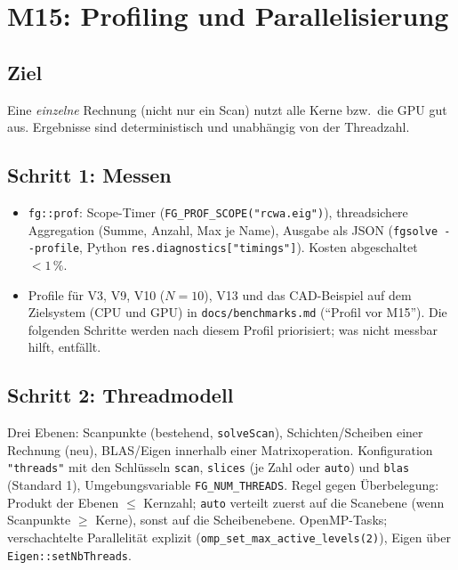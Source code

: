 \section{M15: Profiling und Parallelisierung}\label{sec:parallel}

\subsection{Ziel}
Eine \emph{einzelne} Rechnung (nicht nur ein Scan) nutzt alle Kerne bzw.\ die GPU gut aus. Ergebnisse sind
deterministisch und unabhängig von der Threadzahl.

\subsection{Schritt 1: Messen}
\begin{itemize}[nosep]
  \item \verb|fg::prof|: Scope-Timer (\verb|FG_PROF_SCOPE("rcwa.eig")|), threadsichere Aggregation (Summe, Anzahl, Max
        je Name), Ausgabe als JSON (\verb|fgsolve --profile|, Python \verb|res.diagnostics["timings"]|). Kosten
        abgeschaltet $<1\,\%$.
  \item Profile für V3, V9, V10 ($N=10$), V13 und das CAD-Beispiel auf dem Zielsystem (CPU und GPU) in
        \verb|docs/benchmarks.md| (\enquote{Profil vor M15}). Die folgenden Schritte werden nach diesem Profil priorisiert;
        was nicht messbar hilft, entfällt.
\end{itemize}

\subsection{Schritt 2: Threadmodell}
Drei Ebenen: Scanpunkte (bestehend, \verb|solveScan|), Schichten/Scheiben einer Rechnung (neu), BLAS/Eigen
innerhalb einer Matrixoperation. Konfiguration \verb|"threads"| mit den Schlüsseln \verb|scan|, \verb|slices| (je Zahl oder \verb|auto|) und \verb|blas| (Standard 1),
Umgebungsvariable \verb|FG_NUM_THREADS|. Regel gegen Überbelegung: Produkt der Ebenen $\le$ Kernzahl; \verb|auto|
verteilt zuerst auf die Scanebene (wenn Scanpunkte $\ge$ Kerne), sonst auf die Scheibenebene. OpenMP-Tasks;
verschachtelte Parallelität explizit (\verb|omp_set_max_active_levels(2)|), Eigen über \verb|Eigen::setNbThreads|.

